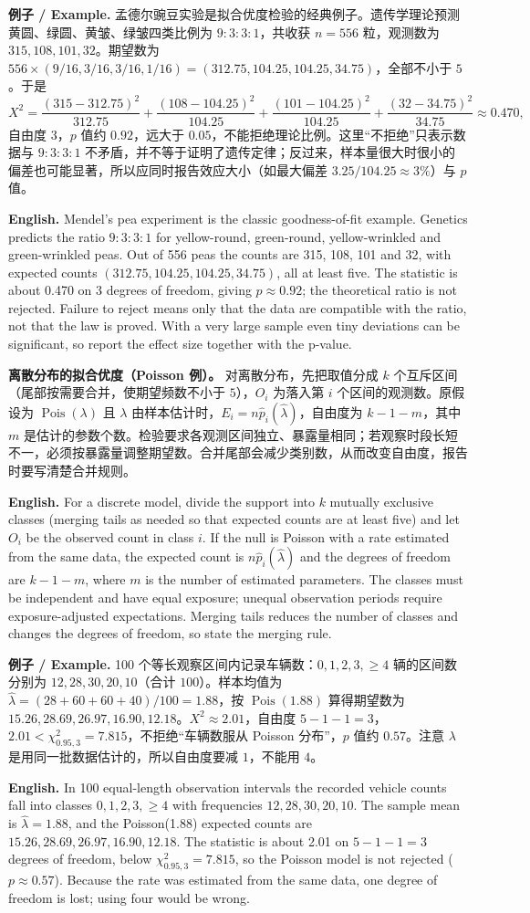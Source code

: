 \documentclass[UTF8,11pt,a4paper]{ctexart}
\newcommand{\EN}[1]{\par\noindent\textbf{English.} #1\par}
\newcommand{\EX}[2]{\par\noindent\textbf{例子 / Example.} #1\par\EN{#2}}
\begin{document}
\EX{孟德尔豌豆实验是拟合优度检验的经典例子。遗传学理论预测黄圆、绿圆、黄皱、绿皱四类比例为 $9:3:3:1$，共收获 $n=556$ 粒，观测数为 $315,108,101,32$。期望数为 $556\times(9/16,3/16,3/16,1/16)=(312.75,104.25,104.25,34.75)$，全部不小于 $5$。于是
\[
X^2=\frac{(315-312.75)^2}{312.75}+\frac{(108-104.25)^2}{104.25}+\frac{(101-104.25)^2}{104.25}+\frac{(32-34.75)^2}{34.75}\approx0.470,
\]
自由度 $3$，$p$ 值约 $0.92$，远大于 $0.05$，不能拒绝理论比例。这里“不拒绝”只表示数据与 $9:3:3:1$ 不矛盾，并不等于证明了遗传定律；反过来，样本量很大时很小的偏差也可能显著，所以应同时报告效应大小（如最大偏差 $3.25/104.25\approx3\%$）与 $p$ 值。}{Mendel's pea experiment is the classic goodness-of-fit example. Genetics predicts the ratio $9:3:3:1$ for yellow-round, green-round, yellow-wrinkled and green-wrinkled peas. Out of 556 peas the counts are 315, 108, 101 and 32, with expected counts $(312.75,104.25,104.25,34.75)$, all at least five. The statistic is about 0.470 on 3 degrees of freedom, giving $p\approx0.92$; the theoretical ratio is not rejected. Failure to reject means only that the data are compatible with the ratio, not that the law is proved. With a very large sample even tiny deviations can be significant, so report the effect size together with the p-value.}

\noindent\textbf{离散分布的拟合优度（Poisson 例）。} 对离散分布，先把取值分成 $k$ 个互斥区间（尾部按需要合并，使期望频数不小于 $5$），$O_i$ 为落入第 $i$ 个区间的观测数。原假设为 $\operatorname{Pois}(\lambda)$ 且 $\lambda$ 由样本估计时，$E_i=n\hat p_i(\hat\lambda)$，自由度为 $k-1-m$，其中 $m$ 是估计的参数个数。检验要求各观测区间独立、暴露量相同；若观察时段长短不一，必须按暴露量调整期望数。合并尾部会减少类别数，从而改变自由度，报告时要写清楚合并规则。
\EN{For a discrete model, divide the support into $k$ mutually exclusive classes (merging tails as needed so that expected counts are at least five) and let $O_i$ be the observed count in class $i$. If the null is Poisson with a rate estimated from the same data, the expected count is $n\hat p_i(\hat\lambda)$ and the degrees of freedom are $k-1-m$, where $m$ is the number of estimated parameters. The classes must be independent and have equal exposure; unequal observation periods require exposure-adjusted expectations. Merging tails reduces the number of classes and changes the degrees of freedom, so state the merging rule.}

\EX{100 个等长观察区间内记录车辆数：$0,1,2,3,\ge4$ 辆的区间数分别为 $12,28,30,20,10$（合计 $100$）。样本均值为 $\hat\lambda=(28+60+60+40)/100=1.88$，按 $\operatorname{Pois}(1.88)$ 算得期望数为 $15.26,28.69,26.97,16.90,12.18$。$X^2\approx2.01$，自由度 $5-1-1=3$，$2.01<\chi^2_{0.95,3}=7.815$，不拒绝“车辆数服从 Poisson 分布”，$p$ 值约 $0.57$。注意 $\lambda$ 是用同一批数据估计的，所以自由度要减 $1$，不能用 $4$。}{In 100 equal-length observation intervals the recorded vehicle counts fall into classes $0,1,2,3,\ge4$ with frequencies $12,28,30,20,10$. The sample mean is $\hat\lambda=1.88$, and the Poisson(1.88) expected counts are $15.26,28.69,26.97,16.90,12.18$. The statistic is about 2.01 on $5-1-1=3$ degrees of freedom, below $\chi^2_{0.95,3}=7.815$, so the Poisson model is not rejected ($p\approx0.57$). Because the rate was estimated from the same data, one degree of freedom is lost; using four would be wrong.}
\end{document}
